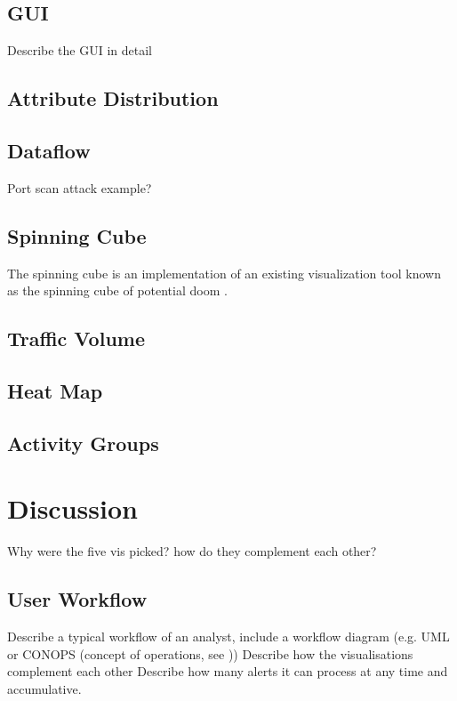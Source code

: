 \subsection{GUI}
{\color{red} Describe the GUI in detail}

\subsection{Attribute Distribution}

\subsection{Dataflow}
{\color{red} Port scan attack example?}

\subsection{Spinning Cube}
{\color{red} The spinning cube is an implementation of an existing visualization tool known as the spinning cube of potential doom \cite{cube04}. }

\subsection{Traffic Volume}

\subsection{Heat Map}

\subsection{Activity Groups}

\section{Discussion}
{\color{red} Why were the five vis picked? how do they complement each other?}

\subsection{User Workflow}
{\color{red}Describe a typical workflow of an analyst, include a workflow diagram (e.g. UML or CONOPS (concept of operations, see ))}
{\color{red}Describe how the visualisations complement each other}
{\color{red}Describe how many alerts it can process at any time and accumulative.}

